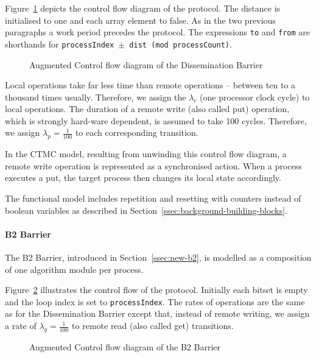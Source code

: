 \documentclass[a4paper, 10pt]{article}
\begin{document}
Figure~\ref{fig:model-dissemination} depicts the control flow diagram of the protocol.
The distance is initialised to one and each array element to false.
As in the two previous paragraphs a work period precedes the protocol.
The expressions \texttt{to} and \texttt{from} are shorthands for \texttt{processIndex $\pm$ dist (mod processCount)}.

\begin{figure}[htbp]
	\centering
	
	\caption{Augmented Control flow diagram of the Dissemination Barrier}
	\label{fig:model-dissemination}
\end{figure}

Local operations take far less time than remote operations -- between ten to a thousand times usually. Therefore, we assign the $\lambda_c$ (one processor clock cycle) to local operations.
The duration of a remote write (also called put) operation, which is strongly hard-ware dependent, is assumed to take 100 cycles. Therefore, we assign $\lambda_p = \frac{1}{100}$ to each corresponding transition.

In the CTMC model, resulting from unwinding this control flow diagram, a remote write operation is represented as a synchronised action. When a process executes a put, the target process then changes its local state accordingly.

The functional model includes repetition and resetting with counters instead of boolean variables as described in Section~\ref{ssec:background-building-blocks}.

\paragraph{B2 Barrier}
\label{ssssec:analysis-modelchecking-modelling-b2}
The B2 Barrier, introduced in Section~\ref{ssec:new-b2}, is modelled as a composition of one algorithm module per process.

Figure~\ref{fig:model-b2} illustrates the control flow of the protocol.
Initially each bitset is empty and the loop index is set to \texttt{processIndex}.
The rates of operations are the same as for the Dissemination Barrier except that, instead of remote writing, we assign a rate of $\lambda_g = \frac{1}{100}$ to remote read (also called get) transitions.

\begin{figure}[htbp]
	\centering
	
	\caption{Augmented Control flow diagram of the B2 Barrier}
	\label{fig:model-b2}
\end{figure}
\end{document}
